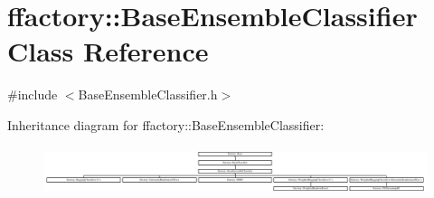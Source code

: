 \hypertarget{classffactory_1_1_base_ensemble_classifier}{\section{ffactory\-:\-:Base\-Ensemble\-Classifier Class Reference}
\label{classffactory_1_1_base_ensemble_classifier}
}


{\ttfamily \#include $<$Base\-Ensemble\-Classifier.\-h$>$}

Inheritance diagram for ffactory\-:\-:Base\-Ensemble\-Classifier\-:\begin{figure}[H]
\begin{center}
\leavevmode
\includegraphics[height=1.421320cm]{classffactory_1_1_base_ensemble_classifier}
\end{center}
\end{figure}
